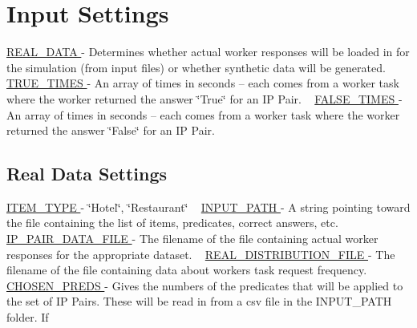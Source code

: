 \hypertarget{toggles_input}{}\section{Input Settings}\label{toggles_input}
\hyperlink{namespacedynamicfilterapp_1_1toggles_a00674fe8ef8f59b37d7fe239813bb627}{R\+E\+A\+L\+\_\+\+D\+A\+TA } -\/ Determines whether actual worker responses will be loaded in for the simulation (from input files) or whether synthetic data will be generated. ~\newline
 \hyperlink{namespacedynamicfilterapp_1_1toggles_a6794acc9ab30adea862f4077cf9adae7}{T\+R\+U\+E\+\_\+\+T\+I\+M\+ES } -\/ An array of times in seconds -- each comes from a worker task where the worker returned the answer \char`\"{}\+True\char`\"{} for an IP Pair. ~\newline
 \hyperlink{namespacedynamicfilterapp_1_1toggles_a809d01bf46cd20093532e7cbc0960874}{F\+A\+L\+S\+E\+\_\+\+T\+I\+M\+ES } -\/ An array of times in seconds -- each comes from a worker task where the worker returned the answer \char`\"{}\+False\char`\"{} for an IP Pair.\hypertarget{toggles_realdata}{}\subsection{Real Data Settings}\label{toggles_realdata}
\hyperlink{namespacedynamicfilterapp_1_1toggles_ab7ef0f87c772b28128250ee46f5390ab}{I\+T\+E\+M\+\_\+\+T\+Y\+PE } -\/ \char`\"{}\+Hotel\char`\"{}, \char`\"{}\+Restaurant\char`\"{} ~\newline
 \hyperlink{namespacedynamicfilterapp_1_1toggles_aca6b14e235be3a92f729918cfcfed5e5}{I\+N\+P\+U\+T\+\_\+\+P\+A\+TH } -\/ A string pointing toward the file containing the list of items, predicates, correct answers, etc.~\newline
 \hyperlink{namespacedynamicfilterapp_1_1toggles_a43d654f8629542974ec1db04c0fc580a}{I\+P\+\_\+\+P\+A\+I\+R\+\_\+\+D\+A\+T\+A\+\_\+\+F\+I\+LE } -\/ The filename of the file containing actual worker responses for the appropriate dataset. ~\newline
 \hyperlink{namespacedynamicfilterapp_1_1toggles_ad581376e3eb6ca15bbbe096863891cec}{R\+E\+A\+L\+\_\+\+D\+I\+S\+T\+R\+I\+B\+U\+T\+I\+O\+N\+\_\+\+F\+I\+LE } -\/ The filename of the file containing data about workers\textquotesingle{} task request frequency. ~\newline
 \hyperlink{namespacedynamicfilterapp_1_1toggles_a1e059d484294d0a2661de21590419600}{C\+H\+O\+S\+E\+N\+\_\+\+P\+R\+E\+DS } -\/ Gives the numbers of the predicates that will be applied to the set of IP Pairs. These will be read in from a csv file in the I\+N\+P\+U\+T\+\_\+\+P\+A\+TH folder. If

